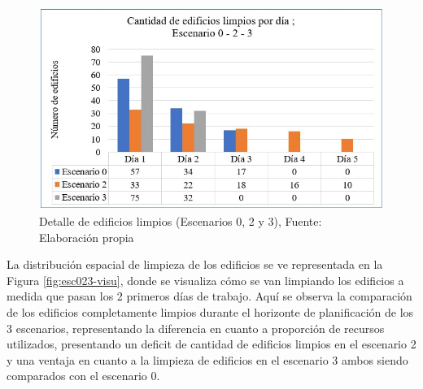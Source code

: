 \documentclass[letterpaper,conference]{IEEEtran}
\begin{document}


\begin{figure}[h!]
\centering
\includegraphics[scale=0.63]{Figuras/INDIC3.jpg} 
\caption{Detalle de edificios limpios (Escenarios 0, 2 y 3), Fuente: Elaboración propia}
\label{fig:esc023graf}
\end{figure}



La distribución espacial de limpieza de los edificios se ve representada en la Figura \ref{fig:esc023-visu}, donde se visualiza cómo se van limpiando los edificios a medida que pasan los 2 primeros días de trabajo. Aquí se observa la comparación de los edificios completamente limpios durante el horizonte de planificación de los 3 escenarios, representando la diferencia en cuanto a proporción de recursos utilizados, presentando un deficit de cantidad de edificios limpios en el escenario 2 y una ventaja en cuanto a la limpieza de edificios en el escenario 3 ambos siendo comparados con el escenario 0.
\end{document}
